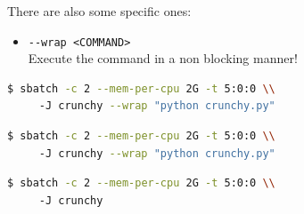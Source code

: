 \documentclass{article}
\begin{document}
There are also some specific ones:
\begin{itemize}
	\item \verb|--wrap <COMMAND>|\\Execute the command in a non blocking manner!
\end{itemize}

\begin{lstlisting}[language=bash, caption={sbatch: jobs in the
background}, frame=single, firstnumber=1]
$ sbatch -c 2 --mem-per-cpu 2G -t 5:0:0 \\
	 -J crunchy --wrap "python crunchy.py"
\end{lstlisting}

\begin{lstlisting}[language=bash, caption={srun: jobs in the
foreground}, frame=single]
$ sbatch -c 2 --mem-per-cpu 2G -t 5:0:0 \\
	 -J crunchy --wrap "python crunchy.py"
\end{lstlisting}

\begin{lstlisting}[language=bash, caption={salloc: allocate and do
nothing}, frame=single]
$ sbatch -c 2 --mem-per-cpu 2G -t 5:0:0 \\
	 -J crunchy 
\end{lstlisting}
\end{document}
